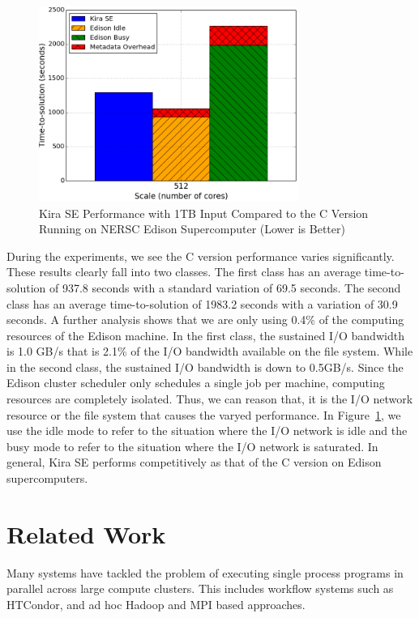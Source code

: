 \documentclass[conference]{IEEEtran}
\newcommand{\up}{\vspace*{-1em}}
\begin{document}
\begin{figure}[h]
	\begin{center}
		\includegraphics[width=85mm]{pictures/1TB-edison}
		\caption{Kira SE Performance with 1TB Input Compared to the C Version Running on NERSC Edison Supercomputer (Lower is Better)
		\label{fig:1tb-edison}}
		\up
  	\end{center}
\end{figure}

During the experiments, we see the C version performance varies significantly. These results
clearly fall into two classes. The first class has an average time-to-solution of 937.8 seconds
with a standard variation of 69.5 seconds. The second class has an average time-to-solution 
of 1983.2 seconds with a variation of 30.9 seconds. A further analysis shows that we are only 
using 0.4\% of the computing resources of the Edison machine. In the first class, the sustained
I/O bandwidth is 1.0 GB/s that is 2.1\% of the I/O bandwidth available on the file system.
While in the second class, the sustained I/O bandwidth is down to 0.5GB/s.
Since the Edison cluster scheduler only schedules a single job per machine, computing resources 
are completely isolated. Thus, we can reason that, it is the I/O network resource or the file system 
that causes the varyed performance. In Figure~\ref{fig:1tb-edison}, we use the idle mode to refer to the 
situation where the I/O network is idle and the busy mode to refer to the situation where the
I/O network is saturated. In general, Kira SE performs competitively as that of the C version
on Edison supercomputers. 


\section{Related Work}
\label{sec:Related}

Many systems have tackled the problem of executing single process programs in parallel
across large compute clusters. This includes workflow systems such as HTCondor,
and ad hoc Hadoop and MPI based approaches.
\end{document}
